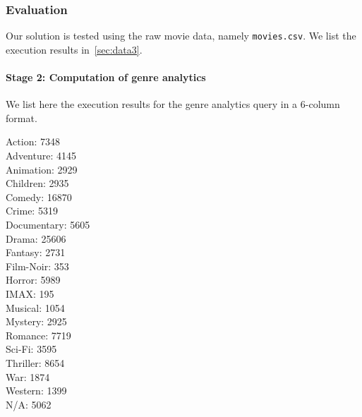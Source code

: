 \documentclass[acmlarge]{acmart}
\begin{document}
\subsubsection{Evaluation} Our solution is tested using the raw movie data, namely \texttt{movies.csv}. We list the execution results in~\autoref{sec:data3}.

\paragraph{Stage 2: Computation of genre analytics}
We list here the execution results for the genre analytics query in a 6-column format.
\begin{multicols}{6}
  \noindent
  Action: 7348
  \\ Adventure: 4145
  \\ Animation: 2929
  \\ Children: 2935
  \\ Comedy: 16870
  \\ Crime: 5319
  \\ Documentary: 5605
  \\ Drama: 25606
  \\ Fantasy: 2731
  \\ Film-Noir: 353
  \\ Horror: 5989
  \\ IMAX: 195
  \\ Musical: 1054
  \\ Mystery: 2925
  \\ Romance: 7719
  \\ Sci-Fi: 3595
  \\ Thriller: 8654
  \\ War: 1874
  \\ Western: 1399
  \\ N/A: 5062
\end{multicols}
\end{document}
